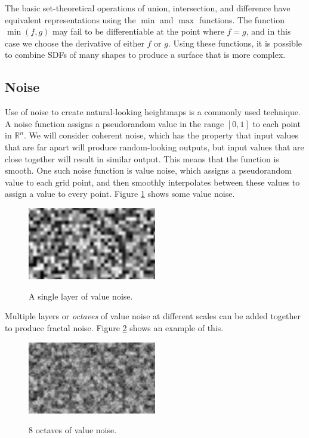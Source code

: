 \documentclass[11pt]{article}
\begin{document}
The basic set-theoretical operations of union, intersection, and difference have equivalent representations using the $\min$ and $\max$ functions. The function $\min\left(f,g\right)$ may fail to be differentiable at the point where $f = g$, and in this case we choose the derivative of either $f$ or $g$. Using these functions, it is possible to combine SDFs of many shapes to produce a surface that is more complex.

\subsection{Noise}
\label{section:noise}
Use of noise to create natural-looking heightmaps is a commonly used technique. A noise function assigns a pseudorandom value in the range $\left[0,1\right]$ to each point in $\mathbb{R}^n$. We will consider coherent noise, which has the property that input values that are far apart will produce random-looking outputs, but input values that are close together will result in similar output. This means that the function is smooth. One such noise function is value noise, which assigns a pseudorandom value to each grid point, and then smoothly interpolates between these values to assign a value to every point. Figure \ref{fig:valuenoise1} shows some value noise.
\begin{figure}
  \caption{A single layer of value noise.}
  \includegraphics[width=0.5\textwidth]{valuenoise1.png}
  \label{fig:valuenoise1}
\end{figure}
Multiple layers or \textit{octaves} of value noise at different scales can be added together to produce fractal noise. Figure \ref{fig:valuenoise} shows an example of this.
\begin{figure}
  \caption{8 octaves of value noise.}
  \includegraphics[width=0.5\textwidth]{valuenoise.png}
  \label{fig:valuenoise}
\end{figure}
\end{document}
